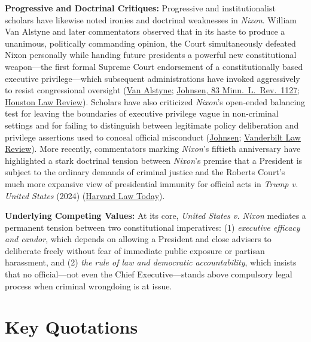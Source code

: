 \documentclass[12pt]{article}
\begin{document}
\textbf{Progressive and Doctrinal Critiques:} Progressive and institutionalist scholars have likewise noted ironies and doctrinal weaknesses in \textit{Nixon}. William Van Alstyne and later commentators observed that in its haste to produce a unanimous, politically commanding opinion, the Court simultaneously defeated Nixon personally while handing future presidents a powerful new constitutional weapon---the first formal Supreme Court endorsement of a constitutionally based executive privilege---which subsequent administrations have invoked aggressively to resist congressional oversight (\href{https://scholarship.law.duke.edu/cgi/viewcontent.cgi?article=5789&context=faculty_scholarship}{Van Alstyne}; \href{https://www.repository.law.indiana.edu/cgi/viewcontent.cgi?article=1542&context=facpub}{Johnsen, 83 Minn.\ L.\ Rev.\ 1127}; \href{https://houstonlawreview.org/article/30078-the-second-article-and-congressional-self-defense}{Houston Law Review}). Scholars have also criticized \textit{Nixon}'s open-ended balancing test for leaving the boundaries of executive privilege vague in non-criminal settings and for failing to distinguish between legitimate policy deliberation and privilege assertions used to conceal official misconduct (\href{https://www.repository.law.indiana.edu/cgi/viewcontent.cgi?article=1542&context=facpub}{Johnsen}; \href{https://scholarship.law.vanderbilt.edu/cgi/viewcontent.cgi?article=1559&context=vlr}{Vanderbilt Law Review}). More recently, commentators marking \textit{Nixon}'s fiftieth anniversary have highlighted a stark doctrinal tension between \textit{Nixon}'s premise that a President is subject to the ordinary demands of criminal justice and the Roberts Court's much more expansive view of presidential immunity for official acts in \textit{Trump v. United States} (2024) (\href{https://hls.harvard.edu/today/are-presidents-above-the-law-50-years-ago-the-supreme-court-said-no/}{Harvard Law Today}).

\textbf{Underlying Competing Values:} At its core, \textit{United States v. Nixon} mediates a permanent tension between two constitutional imperatives: (1) \textit{executive efficacy and candor}, which depends on allowing a President and close advisers to deliberate freely without fear of immediate public exposure or partisan harassment, and (2) \textit{the rule of law and democratic accountability}, which insists that no official---not even the Chief Executive---stands above compulsory legal process when criminal wrongdoing is at issue.

\section{Key Quotations}
\end{document}
